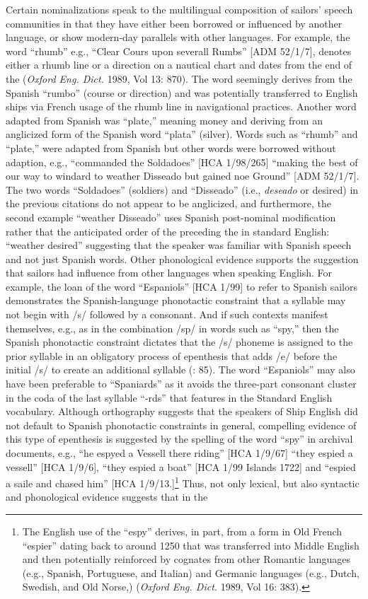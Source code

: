 Certain nominalizations speak to the multilingual composition of sailors’ speech communities in that they have either been borrowed or influenced by another language, or show modern-day parallels with other languages. For example, the word “rhumb” e.g., “Clear Cours upon severall Rumbs” [ADM 52/1/7], denotes either a rhumb line or a direction on a nautical chart and dates from the end of the  (\textit{Oxford Eng. Dict.} 1989, Vol 13: 870). The word seemingly derives from the Spanish “rumbo” (course or direction) and was potentially transferred to English ships via French usage of the rhumb line in navigational practices. Another word adapted from Spanish was “plate,” meaning money and deriving from an anglicized form of the Spanish word “plata” (silver). Words such as “rhumb” and “plate,” were adapted from Spanish but other words were borrowed without adaption, e.g., “commanded the Soldadoes” [HCA 1/98/265] “making the best of our way to windard to weather Disseado but gained noe Ground” [ADM 52/1/7]. The two words “Soldadoes” (soldiers) and “Disseado” (i.e., \textit{deseado} or desired) in the previous citations do not appear to be anglicized, and furthermore, the second example “weather Disseado” uses Spanish post-nominal modification rather that the anticipated order of the  preceding the  in standard English: “weather desired” suggesting that the speaker was familiar with Spanish speech and not just Spanish words. Other phonological evidence supports the suggestion that sailors had influence from other languages when speaking English. For example, the loan of the word “Espaniols” [HCA 1/99] to refer to Spanish sailors demonstrates the Spanish-language phonotactic constraint that a syllable may not begin with /s/ followed by a consonant. And if such contexts manifest themselves, e.g., as in the combination /sp/ in words such as “spy,” then the Spanish phonotactic constraint dictates that the /s/ phoneme is assigned to the prior syllable in an obligatory process of epenthesis that adds /e/ before the initial /s/ to create an additional syllable (\citealt{Schnitzer1997}: 85). The word “Espaniols” may also have been preferable to “Spaniards” as it avoids the three-part consonant cluster in the coda of the last syllable “-rds” that features in the Standard English vocabulary. Although orthography suggests that the speakers of Ship English did not default to Spanish phonotactic constraints in general, compelling evidence of this type of epenthesis is suggested by the spelling of the word “spy” in archival documents, e.g., “he espyed a Vessell there riding” [HCA 1/9/67] “they espied a vessell” [HCA 1/9/6], “they espied a boat” [HCA 1/99  Islands 1722] and “espied a saile and chased him” [HCA 1/9/13.]\footnote{The English use of the  “espy” derives, in part, from a  form in Old French “espier” dating back to around 1250 that was transferred into Middle English and then potentially reinforced by cognates from other Romantic languages (e.g., Spanish, Portuguese, and Italian) and Germanic languages (e.g., Dutch, Swedish, and Old Norse,) (\textit{Oxford Eng. Dict.} 1989, Vol 16: 383).} Thus, not only lexical, but also syntactic and phonological evidence suggests that  in the 